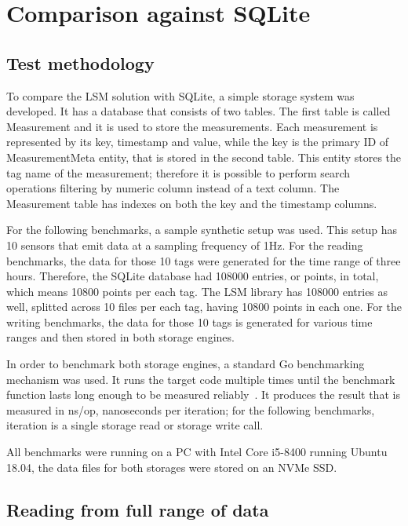 \section{Comparison against SQLite}

\subsection{Test methodology}

To compare the LSM solution with SQLite, a simple storage system was developed. It has a database that consists of two tables. The first table is called Measurement and it is used to store the measurements. Each measurement is represented by its key, timestamp and value, while the key is the primary ID of MeasurementMeta entity, that is stored in the second table. This entity stores the tag name of the measurement; therefore it is possible to perform search operations filtering by numeric column instead of a text column. The Measurement table has indexes on both the key and the timestamp columns.

For the following benchmarks, a sample synthetic setup was used. This setup has 10 sensors that emit data at a sampling frequency of 1Hz. For the reading benchmarks, the data for those 10 tags were generated for the time range of three hours. Therefore, the SQLite database had 108000 entries, or points, in total, which means 10800 points per each tag. The LSM library has 108000 entries as well, splitted across 10 files per each tag, having 10800 points in each one. For the writing benchmarks, the data for those 10 tags is generated for various time ranges and then stored in both storage engines.

In order to benchmark both storage engines, a standard Go benchmarking mechanism was used. It runs the target code multiple times until the benchmark function lasts long enough to be measured reliably~\cite{go_benchmark}. It produces the result that is measured in ns/op, nanoseconds per iteration; for the following benchmarks, iteration is a single storage read or storage write call.

All benchmarks were running on a PC with Intel Core i5-8400 running Ubuntu 18.04, the data files for both storages were stored on an NVMe SSD.

\subsection{Reading from full range of data}

